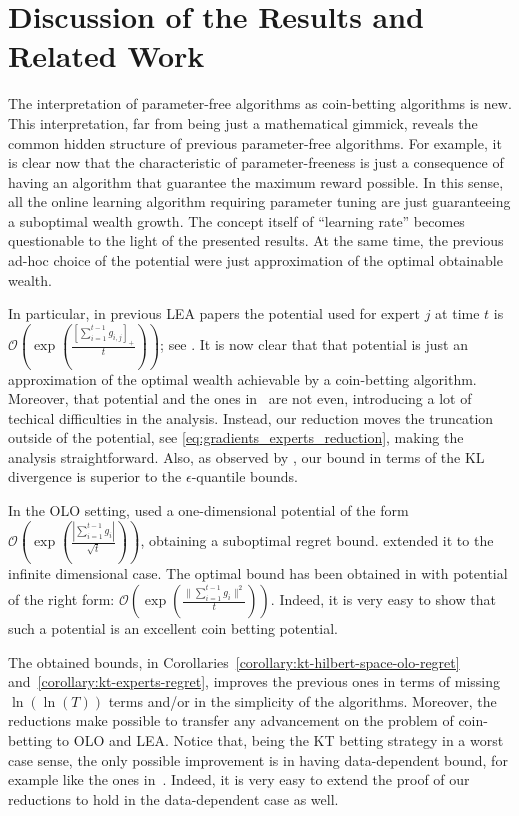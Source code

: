 \section{Discussion of the Results and Related Work}
\label{sec:discussion}

The interpretation of parameter-free algorithms as coin-betting algorithms is
new. This interpretation, far from being just a mathematical gimmick, reveals
the common hidden structure of previous parameter-free algorithms. For example,
it is clear now that the characteristic of parameter-freeness is just a
consequence of having an algorithm that guarantee the maximum reward possible.
In this sense, all the online learning algorithm requiring parameter tuning are
just guaranteeing a suboptimal wealth growth. The concept itself of ``learning rate'' becomes questionable to the light of the presented results.
At the same time, the previous
ad-hoc choice of the potential were just approximation of the optimal obtainable
wealth.

In particular, in previous \ac{LEA} papers the potential used for expert $j$ at
time $t$ is $\mathcal{O}\left(\exp \left(\frac{[\sum_{i=1}^{t-1} g_{i,j}]_+}{t}
\right) \right)$; see \citep{ChaudhuriYH09,LuoE14,LuoS15}. It is now clear that
that potential is just an approximation of the optimal wealth achievable by a
coin-betting algorithm. Moreover, that potential and the ones
in~\citet{ChernovV10,KoolenE15} are not even, introducing a lot of techical
difficulties in the analysis. Instead, our reduction moves the truncation
outside of the potential, see \eqref{eq:gradients_experts_reduction}, making the
analysis straightforward. Also, as observed by \citet{ChernovV10}, our bound in
terms of the KL divergence is superior to the $\epsilon$-quantile bounds.

In the \ac{OLO} setting, \citet{StreeterM12} used a one-dimensional potential of
the form $\mathcal{O}\left(\exp \left(\frac{|\sum_{i=1}^{t-1}
g_{i}|}{\sqrt{t}}\right)\right)$, obtaining a suboptimal regret bound.
\citet{Orabona13} extended it to the infinite dimensional case. The optimal
bound has been obtained in \citet{McMahanO14} with potential of the right form:
$\mathcal{O}\left(\exp \left(\frac{\|\sum_{i=1}^{t-1}
g_{i}\|^2}{t}\right)\right)$. Indeed, it is very easy to show that such a
potential is an excellent coin betting potential.

The obtained bounds, in Corollaries~\ref{corollary:kt-hilbert-space-olo-regret}
and~\ref{corollary:kt-experts-regret}, improves the previous ones in terms of
missing $\ln(\ln(T))$ terms and/or in the simplicity of the algorithms. Moreover, the
reductions make possible to transfer any advancement on the problem of
coin-betting to \ac{OLO} and \ac{LEA}. Notice that, being the \ac{KT} betting
strategy in a worst case sense, the only possible improvement is in having
data-dependent bound, for example like the ones in~\cite{KoolenE15}. Indeed, it
is very easy to extend the proof of our reductions to hold in the data-dependent
case as well.

